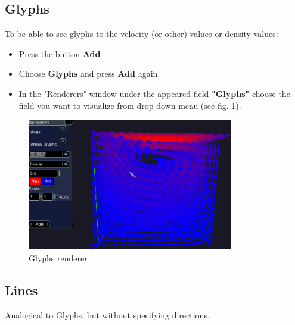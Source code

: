 \documentclass[
12pt, %
a4paper, %
oneside, %
headinclude,footinclude, %
BCOR5mm, %
]{scrartcl}
\begin{document}
\subsection{Glyphs}
To be able to see glyphs to the velocity (or other) values or density values:
\begin{itemize}
\item Press the button \textbf{Add}
\item Choose \textbf{Glyphs} and press \textbf{Add} again.
\item In the "Renderers" window under the appeared field \textbf{"Glyphs"} choose the field you want to visualize from drop-down menu (see fig. \ref{fig:glyphs}).
\end{itemize}
\begin{figure}
 \includegraphics[width=0.8\textwidth]{glyphs.png}
   \caption{Glyphs renderer}
   \label{fig:glyphs}
\end{figure}

\subsection{Lines}
Analogical to Glyphs, but without specifying directions.
\end{document}
